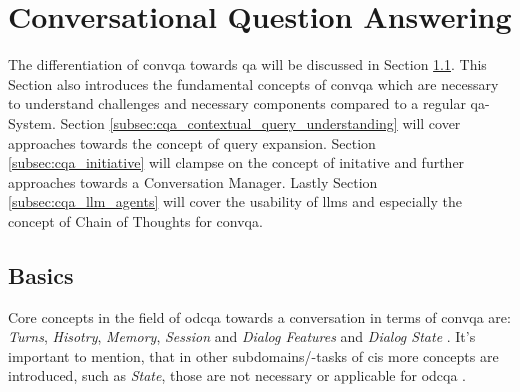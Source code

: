 
\section{Conversational Question Answering}
\label{sec:cqa}

The differentiation of \gls{convqa} towards \gls{qa} will be discussed in Section \ref{subsec:cqa_basics}. This Section also introduces the fundamental concepts of \gls{convqa} which are necessary to understand challenges and necessary components compared to a regular \gls{qa}-System. Section \ref{subsec:cqa_contextual_query_understanding} will cover approaches towards the concept of query expansion. Section \ref{subsec:cqa_initiative} will clampse on the concept of initative and further approaches towards a Conversation Manager. Lastly Section \ref{subsec:cqa_llm_agents} will cover the usability of \gls{llm}s and especially the concept of Chain of Thoughts for \gls{convqa}.

\subsection{Basics}
\label{subsec:cqa_basics}

Core concepts in the field of \gls{odcqa} towards a conversation in terms of \gls{convqa} are: \textit{Turns}, \textit{Hisotry}, \textit{Memory}, \textit{Session} and \textit{Dialog Features} and \textit{Dialog State} \cite{zamani_conversational_2023}. It's important to mention, that in other subdomains/-tasks of \gls{cis} more concepts are introduced, such as \textit{State}, those are not necessary or applicable for \gls{odcqa} \cite{zaib_conversational_2021}.

